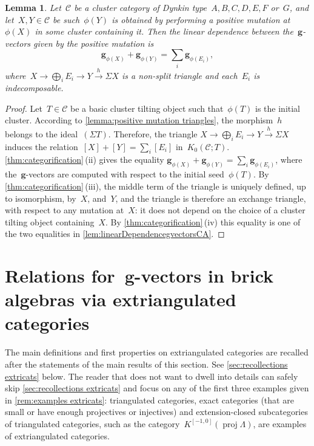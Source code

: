 \documentclass{amsart}
\newtheorem{lemma}[theorem]{Lemma}
\theoremstyle{definition}
\renewcommand{\b}[1]{{\boldsymbol{#1}}} %
\newcommand{\cat}{\mathcal{C}}
\newcommand{\susp}{\Sigma}
\newcommand{\CC}{\phi}
\newcommand{\proj}{\operatorname{proj}}
\begin{document}
\begin{lemma}
\label{lem:uerp categorified}
Let~$\cat$ be a cluster category of Dynkin type~$A,B,C,D,E,F$ or~$G$, and let~$X,Y \in \cat$ be such~$\CC(Y)$ is obtained by performing a positive mutation at~$\CC(X)$ in some cluster containing it.
Then the linear dependence between the~$\b{g}$-vectors given by the positive mutation is
\[
\b{g}_{\CC(X)} + \b{g}_{\CC(Y)} = \sum_i\b{g}_{\CC(E_i)}, 
\]
where~$X\to \bigoplus_i E_i \to Y \xrightarrow{h} \susp X$ is a non-split triangle and each~$E_i$ is indecomposable.
\end{lemma}

\begin{proof}
Let~$T\in\cat$ be a basic cluster tilting object such that~$\CC(T)$ is the initial cluster.
According to \cref{lemma:positive mutation triangles}, the morphism~$h$ belongs to the ideal~$(\susp T)$.
Therefore, the triangle ${X\to \bigoplus_i E_i \to Y \xrightarrow{h} \susp X}$ induces the relation~$[X]+[Y]=\sum_i [E_i]$ in~$K_0(\cat ; T)$.
\cref{thm:categorification}\,(ii) gives the equality ${\b{g}_{\CC(X)} + \b{g}_{\CC(Y)} = \sum_i\b{g}_{\CC(E_i)}}$, where the~$\b{g}$-vectors are computed with respect to the initial seed~$\CC(T)$.
By \cref{thm:categorification}\,(iii), the middle term of the triangle is uniquely defined, up to isomorphism, by~$X$, and~$Y$, and the triangle is therefore an exchange triangle, with respect to any mutation at~$X$: it does not depend on the choice of a cluster tilting object containing~$X$.
By \cref{thm:categorification}\,(iv) this equality is one of the two equalities in \cref{lem:linearDependencegvectorsCA}.
\end{proof}


\section{Relations for~$\b{g}$-vectors in brick algebras via extriangulated categories}
\label{sec:extricats}

The main definitions and first properties on extriangulated categories are recalled after the statements of the main results of this section.
See \cref{sec:recollections extricats} below.
The reader that does not want to dwell into details can safely skip \cref{sec:recollections extricats} and focus on any of the first three examples given in \cref{rem:examples extricats}: triangulated categories, exact categories (that are small or have enough projectives or injectives) and extension-closed subcategories of triangulated categories, such as the category~$K^{[-1,0]}(\proj \Lambda)$, are examples of extriangulated categories.
\end{document}
